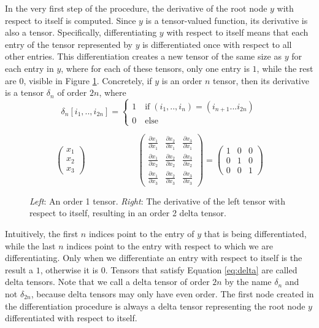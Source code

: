 \documentclass[12pt, a4paper]{report} %
\begin{document}
In the very first step of the procedure, the derivative of the root node $y$ with respect to itself is computed.
Since $y$ is a tensor-valued function, its derivative is also a tensor.
Specifically, differentiating $y$ with respect to itself means that each entry of the tensor represented by $y$ is differentiated once with respect to all other entries.
This differentiation creates a new tensor of the same size as $y$ for each entry in $y$, where for each of these tensors, only one entry is $1$, while the rest are $0$, visible in Figure \ref{fig:delta}.
Concretely, if $y$ is an order $n$ tensor, then its derivative is a tensor $\delta_n$ of order $2n$, where
\begin{equation}
    \delta_n[i_1,..,i_{2n}] = 
    \begin{cases}
        1 \quad \text{if} \; (i_1,..,i_n) = (i_{n+1}...i_{2n}) \\
        0 \quad \text{else}
    \end{cases}
    \label{eq:delta}
\end{equation}
\begin{figure}
    $$
    \begin{pmatrix}
        x_1\\
        x_2\\
        x_3
    \end{pmatrix} \quad \quad \quad \quad \quad \quad
    \begin{pmatrix}
        \frac{\partial x_1}{\partial x_1} & \frac{\partial x_2}{\partial x_1} & \frac{\partial x_3}{\partial x_1} \\
        \frac{\partial x_1}{\partial x_2} & \frac{\partial x_2}{\partial x_2} & \frac{\partial x_3}{\partial x_2} \\
        \frac{\partial x_1}{\partial x_3} & \frac{\partial x_2}{\partial x_3} & \frac{\partial x_3}{\partial x_3}
    \end{pmatrix}
    =
    \begin{pmatrix}
        1 & 0 & 0 \\
        0 & 1 & 0 \\
        0 & 0 & 1
    \end{pmatrix}
    $$
    \caption[Example of a Delta Tensor in a Differentiation DAG]{\textit{Left}: An order 1 tensor. \textit{Right}: The derivative of the left tensor with respect to itself, resulting in an order 2 delta tensor.}
    \label{fig:delta}
\end{figure}

Intuitively, the first $n$ indices point to the entry of $y$ that is being differentiated, while the last $n$ indices point to the entry with respect to which we are differentiating.
Only when we differentiate an entry with respect to itself is the result a $1$, otherwise it is $0$.
Tensors that satisfy Equation \ref{eq:delta} are called delta tensors.
Note that we call a delta tensor of order $2n$ by the name $\delta_n$ and not $\delta_{2n}$, because delta tensors may only have even order.
The first node created in the differentiation procedure is always a delta tensor representing the root node $y$ differentiated with respect to itself.
\end{document}
